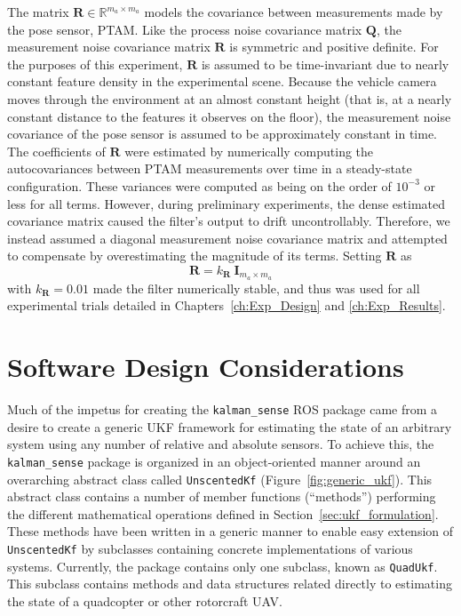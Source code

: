 The matrix $\mathbf{R} \in \mathbb{R}^{m_{a} \times m_{a}}$ models the covariance between measurements made by the pose sensor, PTAM. Like the process noise covariance matrix $\mathbf{Q}$, the measurement noise covariance matrix $\mathbf{R}$ is symmetric and positive definite. For the purposes of this experiment, $\mathbf{R}$ is assumed to be time-invariant due to nearly constant feature density in the experimental scene. Because the vehicle camera moves through the environment at an almost constant height (that is, at a nearly constant distance to the features it observes on the floor), the measurement noise covariance of the pose sensor is assumed to be approximately constant in time. The coefficients of $\mathbf{R}$ were estimated by numerically computing the autocovariances between PTAM measurements over time in a steady-state configuration. These variances were computed as being on the order of $10^{-3}$ or less for all terms. However, during preliminary experiments, the dense estimated covariance matrix caused the filter's output to drift uncontrollably. Therefore, we instead assumed a diagonal measurement noise covariance matrix and attempted to compensate by overestimating the magnitude of its terms. Setting $\mathbf{R}$ as
%
\begin{equation}
\mathbf{R} = k_{\mathbf{R}}\ \mathbf{I}_{m_{a} \times m_{a}}
\end{equation}
%
with $k_{\mathbf{R}} = 0.01$ made the filter numerically stable, and thus was used for all experimental trials detailed in Chapters~\ref{ch:Exp_Design} and \ref{ch:Exp_Results}.

\section{Software Design Considerations}

Much of the impetus for creating the \texttt{kalman\_sense} ROS package came from a desire to create a generic UKF framework for estimating the state of an arbitrary system using any number of relative and absolute sensors. To achieve this, the \texttt{kalman\_sense} package is organized in an object-oriented manner around an overarching abstract class called \texttt{UnscentedKf} (Figure~\ref{fig:generic_ukf}). This abstract class contains a number of member functions (``methods'') performing the different mathematical operations defined in Section~\ref{sec:ukf_formulation}. These methods have been written in a generic manner to enable easy extension of \texttt{UnscentedKf} by subclasses containing concrete implementations of various systems. Currently, the package contains only one subclass, known as \texttt{QuadUkf}. This subclass contains methods and data structures related directly to estimating the state of a quadcopter or other rotorcraft UAV.

